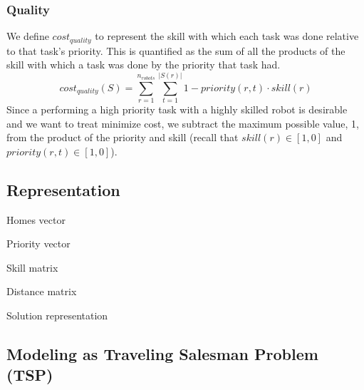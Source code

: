 \documentclass[a4paper]{article}
\begin{document}
\subsubsection{Quality}

We define $\mathit{cost}_\mathit{quality}$ to represent the skill with which each task was done relative to that task's priority. This is quantified as the sum of all the products of the skill with which a task was done by the priority that task had.
$$
\mathit{cost}_\mathit{quality}(S) =
  \sum^{n_\mathit{robots}}_{r=1}
  \sum^{|S(r)|}_{t=1}
  1 - \mathit{priority}(r, t) \cdot \mathit{skill}(r)
$$
Since a performing a high priority task with a highly skilled robot is desirable and we want to treat minimize cost, we subtract the maximum possible value, 1, from the product of the priority and skill (recall that $\mathit{skill}(r) \in [1, 0]$ and $\mathit{priority}(r, t) \in [1, 0]$).

\subsection{Representation}

Homes vector

Priority vector

Skill matrix

Distance matrix

Solution representation

\subsection{Modeling as Traveling Salesman Problem (TSP)}

\end{document}
